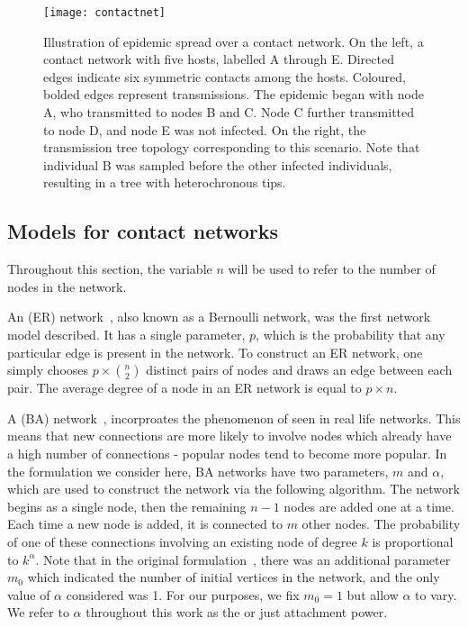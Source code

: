 \begin{figure}[ht]
  \centering
  \label{fig:contactnet}
  \texttt{[image: contactnet]}
  \caption[Illustration of a epidemic spread over a contact network]
  {Illustration of epidemic spread over a contact network. On the left, a
   contact network with five hosts, labelled A through E. Directed edges
   indicate six symmetric contacts among the hosts. Coloured, bolded edges
   represent transmissions. The epidemic began with node A, who transmitted to
   nodes B and C. Node C further transmitted to node D, and node E was not
   infected. On the right, the transmission tree topology corresponding to this
   scenario. Note that individual B was sampled before the other infected
   individuals, resulting in a tree with heterochronous tips.}
\end{figure}

\subsection{Models for contact networks}
\label{subsubsec:generative}

Throughout this section, the variable $n$ will be used to refer to the number
of nodes in the network. 

An  (ER) network~\autocite{erdos1960evolution}, also
known as a Bernoulli network, was the first network model described. It has a
single parameter, $p$, which is the probability that any particular edge is
present in the network. To construct an ER network, one simply chooses
$p \times \binom{n}{2}$ distinct pairs of nodes and draws an edge between each
pair. The average degree of a node in an ER network is equal to $p \times n$.

A  (BA) network~\autocite{barabasi1999emergence},
incorproates the phenomenon of  seen in real life
networks. This means that new connections are more likely to involve nodes
which already have a high number of connections - popular nodes tend to become
more popular. In the formulation we consider here, BA networks have two
parameters, $m$ and $\alpha$, which are used to construct the network via the
following algorithm. The network begins as a single node, then the remaining
$n-1$ nodes are added one at a time. Each time a new node is added, it is
connected to $m$ other nodes. The probability of one of these connections
involving an existing node of degree $k$ is proportional to $k^\alpha$. Note
that in the original formulation~\autocite{barabasi1999emergence}, there was an
additional parameter $m_0$ which indicated the number of initial vertices in
the network, and the only value of $\alpha$ considered was 1. For our purposes,
we fix $m_0 = 1$ but allow $\alpha$ to vary. We refer to $\alpha$ throughout
this work as the  or just attachment power.

